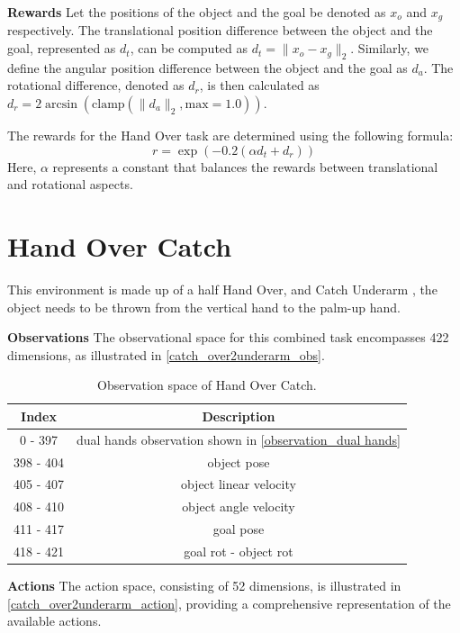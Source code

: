 \documentclass{article}
\begin{document}
\textbf{Rewards} Let the positions of the object and the goal be denoted as $x_o$ and $x_g$ respectively. The translational position difference between the object and the goal, represented as $d_t$, can be computed as $d_t = \lVert x_o - x_g \rVert_2$. Similarly, we define the angular position difference between the object and the goal as $d_a$. The rotational difference, denoted as $d_r$, is then calculated as $d_r = 2 \arcsin(\mathrm{clamp}(\lVert d_a \rVert_2, \text{max} = 1.0))$.

The rewards for the Hand Over task are determined using the following formula:
\begin{equation}
r = \exp(-0.2(\alpha d_t + d_r))
\end{equation}
Here, $\alpha$ represents a constant that balances the rewards between translational and rotational aspects.

\section*{Hand Over Catch}
This environment is made up of a half Hand Over, and Catch Underarm \cite{chen2022towards}, the object needs to be thrown from the vertical hand to the palm-up hand. 

\textbf{Observations} The observational space for this combined task encompasses 422 dimensions, as illustrated in \autoref{catch_over2underarm_obs}.

\begin{table}[htbp]
    \centering
    \caption{Observation space of Hand Over Catch.}
    \begin{tabular}{c|c}
    \toprule  %
    Index&Description\\\hline
    0 - 397&	dual hands observation shown in \autoref{observation_dual hands}\\\hline
    398 - 404&	object pose\\\hline
    405 - 407&	object linear velocity\\\hline
    408 - 410&	object angle velocity\\\hline
    411 - 417&	goal pose\\\hline
    418 - 421&	goal rot - object rot\\
    \bottomrule %
    \end{tabular}
    \label{catch_over2underarm_obs}
\end{table}

\textbf{Actions} The action space, consisting of 52 dimensions, is illustrated in \autoref{catch_over2underarm_action}, providing a comprehensive representation of the available actions.
\end{document}

